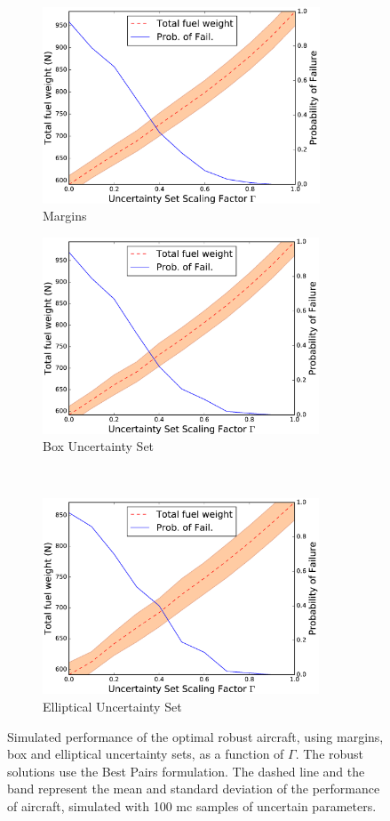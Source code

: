 \begin{figure}[ht]
    \centering
    \captionsetup{justification=centering, font=small}
    \begin{subfigure}{0.49\textwidth}
        \centering
        \includegraphics[height=2.3in]{signomial_simple_flight/margins.eps}
         \caption{Margins}
    \end{subfigure}%
    \begin{subfigure}{0.49\textwidth}
        \centering
        \includegraphics[height=2.3in]{signomial_simple_flight/box_best_pairs.eps}
         \caption{Box Uncertainty Set}
    \end{subfigure}%
    \\
    \begin{subfigure}{0.49\textwidth}
        \centering
        \includegraphics[height=2.3in]{signomial_simple_flight/ell_best_pairs.eps}
         \caption{Elliptical Uncertainty Set}
    \end{subfigure}
    \caption{Simulated performance of the optimal robust aircraft, using margins, box and elliptical uncertainty sets,
    as a function of $\Gamma$. The robust solutions use the Best Pairs formulation.
    The dashed line and the band represent the mean and standard deviation of the performance
    of aircraft, simulated with 100 \gls{mc} samples of uncertain parameters.}
    \label{fig:probOfFailure}
\end{figure}

